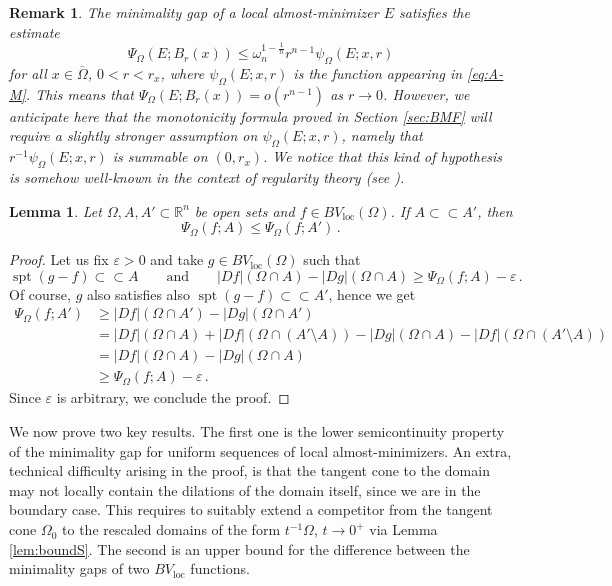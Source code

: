\documentclass[a4paper,reqno,11pt]{amsart}
\newtheorem{lemma}[theorem]{Lemma}
\newtheorem{remark}[theorem]{Remark}
\newcommand{\R}{\mathbb{R}}
\newcommand{\e}{\varepsilon}
\newcommand{\spt}{\mathop{\mathrm{spt}}}
\newcommand{\loc}{\mathop{\mathrm{loc}}}
\renewcommand{\Subset}{\subset\!\subset}
\begin{document}
\begin{remark}
The minimality gap of a local almost-minimizer $E$ satisfies the estimate 
\begin{equation*} %
\Psi_{\Omega}(E;B_{r}(x)) \leq \omega_{n}^{1-\frac{1}{n}} r^{n-1} \psi_{\Omega}(E;x,r)
\end{equation*}
for all $x \in \overline{\Omega}$, $0 < r < r_{x}$, where $\psi_{\Omega}(E;x,r)$ is the function appearing in \eqref{eq:A-M}. This means that $\Psi_{\Omega}(E;B_{r}(x)) = o(r^{n-1})$ as $r\to 0$. However, we anticipate here that the monotonicity formula proved in Section \ref{sec:BMF} will require a slightly stronger assumption on $\psi_{\Omega}(E;x,r)$, namely that $r^{-1}\psi_{\Omega}(E;x,r)$ is summable on $(0,r_{x})$. We notice that this kind of hypothesis is somehow well-known in the context of regularity theory (see \cite{Tamanini_quadLecce}).
\end{remark}

\begin{lemma}
Let $\Omega, A, A' \subset \R^{n}$ be open sets and $f \in BV_{\loc}(\Omega)$. If $A \Subset A'$, then
\begin{equation*}
\Psi_{\Omega}(f;A) \leq \Psi_{\Omega}(f;A') \, .
\end{equation*}
\end{lemma}
\begin{proof}
Let us fix $\e > 0$ and take $g \in BV_{\loc}(\Omega)$ such that 
\begin{equation*}
\spt(g - f) \Subset A \qquad \text{and}\qquad 
|Df|(\Omega \cap A) - |Dg|(\Omega \cap A) \geq \Psi_{\Omega}(f;A) - \e \, .
\end{equation*}
Of course, $g$ also satisfies also $\spt(g - f) \Subset A'$, hence 
we get
\begin{align*}
\Psi_{\Omega}(f;A') & \geq |Df|(\Omega \cap A') - |D g|(\Omega \cap A') \\
& = |Df|(\Omega \cap A) + |Df|(\Omega\cap (A' \setminus A)) - |D g|(\Omega \cap A) - |D f|(\Omega \cap (A' \setminus A)) \\
			& = |Df|(\Omega \cap A) - |Dg|(\Omega \cap A) \\
			& \geq \Psi_{\Omega}(f;A) - \e \, .
\end{align*}
Since $\e$ is arbitrary, we conclude the proof.
\end{proof}


We now prove two key results. The first one is the lower semicontinuity property of the minimality gap for uniform sequences of local almost-minimizers. An extra, technical difficulty arising in the proof, is that the tangent cone to the domain may not locally contain the dilations of the domain itself, since we are in the boundary case. This requires to suitably extend a competitor from the tangent cone $\Omega_{0}$ to the rescaled domains of the form $t^{-1}\Omega$, $t\to 0^{+}$ via Lemma \ref{lem:boundS}.
The second is an upper bound for the difference between the minimality gaps of two $BV_{\loc}$ functions. 
\end{document}
